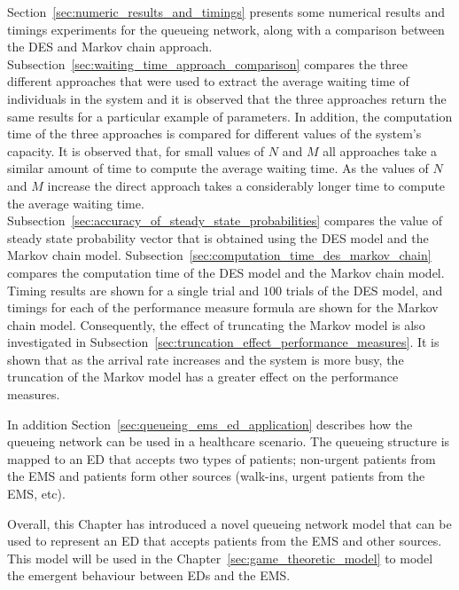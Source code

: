 Section~\ref{sec:numeric_results_and_timings} presents some numerical
results and timings experiments for the queueing network, along with
a comparison between the DES and Markov chain approach.
Subsection~\ref{sec:waiting_time_approach_comparison} compares the three
different approaches that were used to extract the average waiting time of
individuals in the system and it is observed that the three approaches return
the same results for a particular example of parameters.
In addition, the computation time of the three approaches is compared for
different values of the system's capacity.
It is observed that, for small values of \(N\) and \(M\) all
approaches take a similar amount of time to compute the average waiting time.
As the values of \(N\) and \(M\) increase the direct approach takes a
considerably longer time to compute the average waiting time.
Subsection~\ref{sec:accuracy_of_steady_state_probabilities} compares the
value of steady state probability vector that is obtained using the
DES model and the Markov chain model.
Subsection~\ref{sec:computation_time_des_markov_chain} compares the
computation time of the DES model and the Markov chain model.
Timing results are shown for a single trial and \(100\) trials of the DES
model, and timings for each of the performance measure formula are shown for
the Markov chain model.
Consequently, the effect of truncating the Markov model is also investigated
in Subsection~\ref{sec:truncation_effect_performance_measures}.
It is shown that as the arrival rate increases and the system is more busy,
the truncation of the Markov model has a greater effect on the performance
measures.

In addition Section~\ref{sec:queueing_ems_ed_application} describes how the
queueing network can be used in a healthcare scenario.
The queueing structure is mapped to an ED that accepts two types of patients;
non-urgent patients from the EMS and patients form other sources
(walk-ins, urgent patients from the EMS, etc).

Overall, this Chapter has introduced a novel queueing network model that can
be used to represent an ED that accepts patients from the EMS and other
sources.
This model will be used in the Chapter~\ref{sec:game_theoretic_model} to
model the emergent behaviour between EDs and the EMS.
